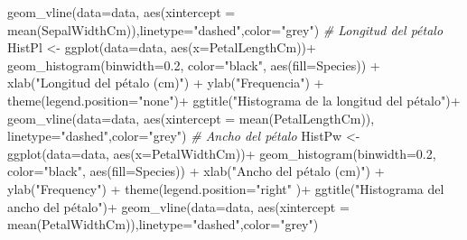 \documentclass[
]{article}
\newenvironment{Shaded}{\begin{snugshade}}{\end{snugshade}}
\newcommand{\AttributeTok}[1]{\textcolor[rgb]{0.77,0.63,0.00}{#1}}
\newcommand{\CommentTok}[1]{\textcolor[rgb]{0.56,0.35,0.01}{\textit{#1}}}
\newcommand{\FloatTok}[1]{\textcolor[rgb]{0.00,0.00,0.81}{#1}}
\newcommand{\FunctionTok}[1]{\textcolor[rgb]{0.00,0.00,0.00}{#1}}
\newcommand{\NormalTok}[1]{#1}
\newcommand{\OtherTok}[1]{\textcolor[rgb]{0.56,0.35,0.01}{#1}}
\newcommand{\SpecialCharTok}[1]{\textcolor[rgb]{0.00,0.00,0.00}{#1}}
\newcommand{\StringTok}[1]{\textcolor[rgb]{0.31,0.60,0.02}{#1}}
\begin{document}
\begin{Shaded}
\begin{Highlighting}[]
  \FunctionTok{geom\_vline}\NormalTok{(}\AttributeTok{data=}\NormalTok{data, }\FunctionTok{aes}\NormalTok{(}\AttributeTok{xintercept =} \FunctionTok{mean}\NormalTok{(SepalWidthCm)),}\AttributeTok{linetype=}\StringTok{"dashed"}\NormalTok{,}\AttributeTok{color=}\StringTok{"grey"}\NormalTok{)}
\CommentTok{\# Longitud del pétalo}
\NormalTok{HistPl }\OtherTok{\textless{}{-}} \FunctionTok{ggplot}\NormalTok{(}\AttributeTok{data=}\NormalTok{data, }\FunctionTok{aes}\NormalTok{(}\AttributeTok{x=}\NormalTok{PetalLengthCm))}\SpecialCharTok{+}
  \FunctionTok{geom\_histogram}\NormalTok{(}\AttributeTok{binwidth=}\FloatTok{0.2}\NormalTok{, }\AttributeTok{color=}\StringTok{"black"}\NormalTok{, }\FunctionTok{aes}\NormalTok{(}\AttributeTok{fill=}\NormalTok{Species)) }\SpecialCharTok{+} 
  \FunctionTok{xlab}\NormalTok{(}\StringTok{"Longitud del pétalo (cm)"}\NormalTok{) }\SpecialCharTok{+}  
  \FunctionTok{ylab}\NormalTok{(}\StringTok{"Frequencia"}\NormalTok{) }\SpecialCharTok{+} 
  \FunctionTok{theme}\NormalTok{(}\AttributeTok{legend.position=}\StringTok{"none"}\NormalTok{)}\SpecialCharTok{+}
  \FunctionTok{ggtitle}\NormalTok{(}\StringTok{"Histograma de la longitud del pétalo"}\NormalTok{)}\SpecialCharTok{+}
  \FunctionTok{geom\_vline}\NormalTok{(}\AttributeTok{data=}\NormalTok{data, }\FunctionTok{aes}\NormalTok{(}\AttributeTok{xintercept =} \FunctionTok{mean}\NormalTok{(PetalLengthCm)),}
             \AttributeTok{linetype=}\StringTok{"dashed"}\NormalTok{,}\AttributeTok{color=}\StringTok{"grey"}\NormalTok{)}
\CommentTok{\# Ancho del pétalo}
\NormalTok{HistPw }\OtherTok{\textless{}{-}} \FunctionTok{ggplot}\NormalTok{(}\AttributeTok{data=}\NormalTok{data, }\FunctionTok{aes}\NormalTok{(}\AttributeTok{x=}\NormalTok{PetalWidthCm))}\SpecialCharTok{+}
  \FunctionTok{geom\_histogram}\NormalTok{(}\AttributeTok{binwidth=}\FloatTok{0.2}\NormalTok{, }\AttributeTok{color=}\StringTok{"black"}\NormalTok{, }\FunctionTok{aes}\NormalTok{(}\AttributeTok{fill=}\NormalTok{Species)) }\SpecialCharTok{+} 
  \FunctionTok{xlab}\NormalTok{(}\StringTok{"Ancho del pétalo (cm)"}\NormalTok{) }\SpecialCharTok{+}  
  \FunctionTok{ylab}\NormalTok{(}\StringTok{"Frequency"}\NormalTok{) }\SpecialCharTok{+} 
  \FunctionTok{theme}\NormalTok{(}\AttributeTok{legend.position=}\StringTok{"right"}\NormalTok{ )}\SpecialCharTok{+}
  \FunctionTok{ggtitle}\NormalTok{(}\StringTok{"Histograma del ancho del pétalo"}\NormalTok{)}\SpecialCharTok{+}
  \FunctionTok{geom\_vline}\NormalTok{(}\AttributeTok{data=}\NormalTok{data, }\FunctionTok{aes}\NormalTok{(}\AttributeTok{xintercept =} \FunctionTok{mean}\NormalTok{(PetalWidthCm)),}\AttributeTok{linetype=}\StringTok{"dashed"}\NormalTok{,}\AttributeTok{color=}\StringTok{"grey"}\NormalTok{)}

\end{Highlighting}
\end{Shaded}
\end{document}
